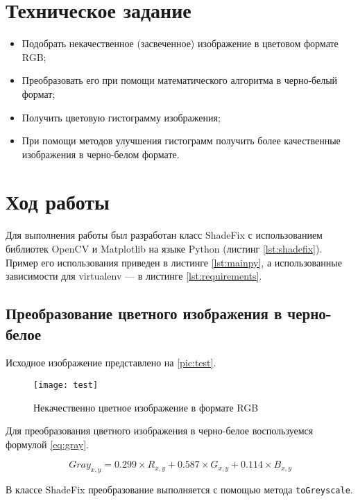 \section{Техническое задание}

\begin{itemize}
	\item Подобрать некачественное (засвеченное) изображение в цветовом формате RGB;
	\item Преобразовать его при помощи математического алгоритма в черно-белый формат;
	\item Получить цветовую гистограмму изображения;
	\item При помощи методов улучшения гистограмм получить более качественные изображения в черно-белом формате.
\end{itemize}

\section{Ход работы}

Для выполнения работы был разработан класс ShadeFix с использованием библиотек OpenCV и Matplotlib на языке Python (листинг \vref{lst:shadefix}). Пример его использования приведен в листинге \cref{lst:mainpy}, а использованные зависимости для virtualenv --- в листинге \cref{lst:requirements}.

\subsection{Преобразование цветного изображения в черно-белое}

Исходное изображение представлено на \vref{pic:test}.

\begin{figure}[H]
	\centering
	\texttt{[image: test]}
	\caption{Некачественно цветное изображение в формате RGB}
	\label{pic:test}
\end{figure}

Для преобразования цветного изображения в черно-белое воспользуемся формулой \vref{eq:gray}.

\begin{equation} \label{eq:gray}
	Gray_{x,y} = 0.299 \times R_{x,y} + 0.587 \times G_{x,y} + 0.114 \times B_{x,y}
\end{equation}

В классе ShadeFix преобразование выполняется с помощью метода \texttt{toGreyscale}.

